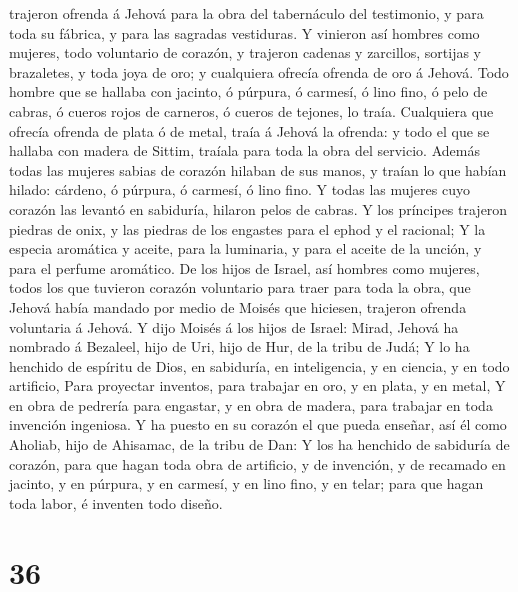 trajeron ofrenda á Jehová para la obra del tabernáculo del testimonio, y
para toda su fábrica, y para las sagradas vestiduras.  Y
vinieron así hombres como mujeres, todo voluntario de corazón, y
trajeron cadenas y zarcillos, sortijas y brazaletes, y toda joya de oro;
y cualquiera ofrecía ofrenda de oro á Jehová.  Todo
hombre que se hallaba con jacinto, ó púrpura, ó carmesí, ó lino fino, ó
pelo de cabras, ó cueros rojos de carneros, ó cueros de tejones, lo
traía.  Cualquiera que ofrecía ofrenda de plata ó de
metal, traía á Jehová la ofrenda: y todo el que se hallaba con madera de
Sittim, traíala para toda la obra del servicio.  Además
todas las mujeres sabias de corazón hilaban de sus manos, y traían lo
que habían hilado: cárdeno, ó púrpura, ó carmesí, ó lino fino.
 Y todas las mujeres cuyo corazón las levantó en
sabiduría, hilaron pelos de cabras.  Y los príncipes
trajeron piedras de onix, y las piedras de los engastes para el ephod y
el racional;  Y la especia aromática y aceite, para la
luminaria, y para el aceite de la unción, y para el perfume aromático.
 De los hijos de Israel, así hombres como mujeres, todos
los que tuvieron corazón voluntario para traer para toda la obra, que
Jehová había mandado por medio de Moisés que hiciesen, trajeron ofrenda
voluntaria á Jehová.  Y dijo Moisés á los hijos de
Israel: Mirad, Jehová ha nombrado á Bezaleel, hijo de Uri, hijo de Hur,
de la tribu de Judá;  Y lo ha henchido de espíritu de
Dios, en sabiduría, en inteligencia, y en ciencia, y en todo artificio,
 Para proyectar inventos, para trabajar en oro, y en
plata, y en metal,  Y en obra de pedrería para engastar,
y en obra de madera, para trabajar en toda invención ingeniosa.
 Y ha puesto en su corazón el que pueda enseñar, así él
como Aholiab, hijo de Ahisamac, de la tribu de Dan:  Y
los ha henchido de sabiduría de corazón, para que hagan toda obra de
artificio, y de invención, y de recamado en jacinto, y en púrpura, y en
carmesí, y en lino fino, y en telar; para que hagan toda labor, é
inventen todo diseño.

\hypertarget{section-35}{%
\section{36}\label{section-35}}

